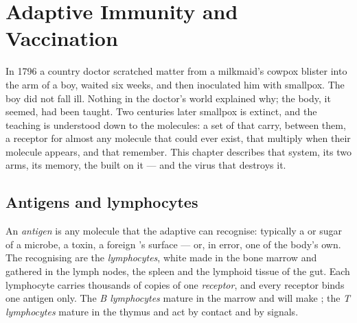 \chapter{Adaptive Immunity and Vaccination}\label{ch:g12:adaptive-immunity}

In 1796 a country doctor scratched matter from a milkmaid's cowpox
blister into the arm of a boy, waited six weeks, and then inoculated
him with smallpox. The boy did not fall ill. Nothing in the doctor's
world explained why; the body, it seemed, had been taught. Two
centuries later smallpox is extinct, and the teaching is understood
down to the molecules: a set of  that carry, between them, a
receptor for almost any molecule that could ever exist, that
multiply when their molecule appears, and that remember. This chapter
describes that system, its two arms, its memory, the  built on
it --- and the virus that destroys it.

\section{Antigens and lymphocytes}

\begin{definition}\label{def:g12:adaptive-immunity:antigen}
An \emph{antigen} is any molecule that the adaptive
 can recognise: typically a  or sugar of a
microbe, a toxin, a foreign 's surface --- or, in error, one of
the body's own. The recognising  are the
\emph{lymphocytes}, white  made in the bone
marrow and gathered in the lymph nodes, the spleen and the lymphoid
tissue of the gut. Each lymphocyte carries thousands of copies of one
\emph{receptor}, and every receptor binds one antigen only. The
\emph{B lymphocytes} mature in the marrow and will make ;
the \emph{T lymphocytes} mature in the thymus and act by contact and
by signals.
\end{definition}

